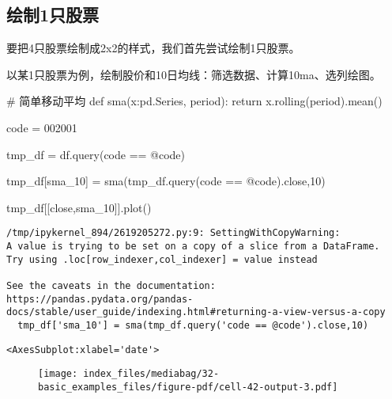 \documentclass[
  letterpaper,
  DIV=11,
  numbers=noendperiod]{scrreprt}
\newenvironment{Shaded}{\begin{snugshade}}{\end{snugshade}}
\newcommand{\CommentTok}[1]{\textcolor[rgb]{0.37,0.37,0.37}{#1}}
\newcommand{\ControlFlowTok}[1]{\textcolor[rgb]{0.00,0.23,0.31}{#1}}
\newcommand{\DecValTok}[1]{\textcolor[rgb]{0.68,0.00,0.00}{#1}}
\newcommand{\KeywordTok}[1]{\textcolor[rgb]{0.00,0.23,0.31}{#1}}
\newcommand{\NormalTok}[1]{\textcolor[rgb]{0.00,0.23,0.31}{#1}}
\newcommand{\OperatorTok}[1]{\textcolor[rgb]{0.37,0.37,0.37}{#1}}
\newcommand{\StringTok}[1]{\textcolor[rgb]{0.13,0.47,0.30}{#1}}
\begin{document}
\hypertarget{ux7ed8ux52361ux53eaux80a1ux7968}{%
\subsection{绘制1只股票}\label{ux7ed8ux52361ux53eaux80a1ux7968}}

要把4只股票绘制成2x2的样式，我们首先尝试绘制1只股票。

以某1只股票为例，绘制股价和10日均线：筛选数据、计算10ma、选列绘图。

\begin{Shaded}
\begin{Highlighting}[]
\CommentTok{\# 简单移动平均}
\KeywordTok{def}\NormalTok{ sma(x:pd.Series, period):}
    \ControlFlowTok{return}\NormalTok{ x.rolling(period).mean()}

\NormalTok{code }\OperatorTok{=} \StringTok{\textquotesingle{}002001\textquotesingle{}}

\NormalTok{tmp\_df }\OperatorTok{=}\NormalTok{ df.query(}\StringTok{\textquotesingle{}code == @code\textquotesingle{}}\NormalTok{) }

\NormalTok{tmp\_df[}\StringTok{\textquotesingle{}sma\_10\textquotesingle{}}\NormalTok{] }\OperatorTok{=}\NormalTok{ sma(tmp\_df.query(}\StringTok{\textquotesingle{}code == @code\textquotesingle{}}\NormalTok{).close,}\DecValTok{10}\NormalTok{)}

\NormalTok{tmp\_df[[}\StringTok{\textquotesingle{}close\textquotesingle{}}\NormalTok{,}\StringTok{\textquotesingle{}sma\_10\textquotesingle{}}\NormalTok{]].plot()}
\end{Highlighting}
\end{Shaded}

\begin{verbatim}
/tmp/ipykernel_894/2619205272.py:9: SettingWithCopyWarning: 
A value is trying to be set on a copy of a slice from a DataFrame.
Try using .loc[row_indexer,col_indexer] = value instead

See the caveats in the documentation: https://pandas.pydata.org/pandas-docs/stable/user_guide/indexing.html#returning-a-view-versus-a-copy
  tmp_df['sma_10'] = sma(tmp_df.query('code == @code').close,10)
\end{verbatim}

\begin{verbatim}
<AxesSubplot:xlabel='date'>
\end{verbatim}

\begin{figure}[H]

{\centering \texttt{[image: index\_files/mediabag/32-basic\_examples\_files/figure-pdf/cell-42-output-3.pdf]}

}

\end{figure}
\end{document}
